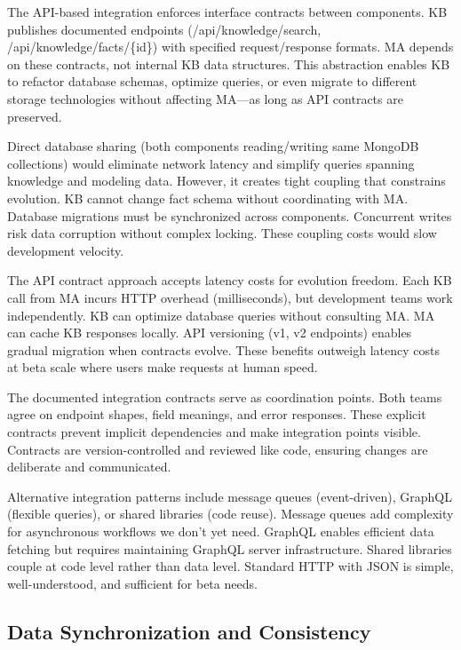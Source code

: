 \documentclass[12pt,a4paper]{article}
\begin{document}
The API-based integration enforces interface contracts between components. KB publishes documented endpoints (/api/knowledge/search, /api/knowledge/facts/\{id\}) with specified request/response formats. MA depends on these contracts, not internal KB data structures. This abstraction enables KB to refactor database schemas, optimize queries, or even migrate to different storage technologies without affecting MA—as long as API contracts are preserved.

Direct database sharing (both components reading/writing same MongoDB collections) would eliminate network latency and simplify queries spanning knowledge and modeling data. However, it creates tight coupling that constrains evolution. KB cannot change fact schema without coordinating with MA. Database migrations must be synchronized across components. Concurrent writes risk data corruption without complex locking. These coupling costs would slow development velocity.

The API contract approach accepts latency costs for evolution freedom. Each KB call from MA incurs HTTP overhead (milliseconds), but development teams work independently. KB can optimize database queries without consulting MA. MA can cache KB responses locally. API versioning (v1, v2 endpoints) enables gradual migration when contracts evolve. These benefits outweigh latency costs at beta scale where users make requests at human speed.

The documented integration contracts serve as coordination points. Both teams agree on endpoint shapes, field meanings, and error responses. These explicit contracts prevent implicit dependencies and make integration points visible. Contracts are version-controlled and reviewed like code, ensuring changes are deliberate and communicated.

Alternative integration patterns include message queues (event-driven), GraphQL (flexible queries), or shared libraries (code reuse). Message queues add complexity for asynchronous workflows we don't yet need. GraphQL enables efficient data fetching but requires maintaining GraphQL server infrastructure. Shared libraries couple at code level rather than data level. Standard HTTP with JSON is simple, well-understood, and sufficient for beta needs.

\subsection{Data Synchronization and Consistency}
\end{document}
